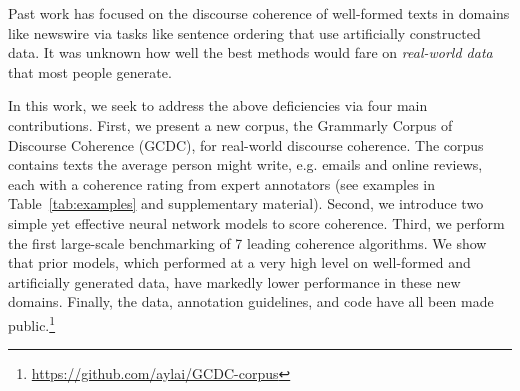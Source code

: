 \documentclass[11pt,a4paper]{article}
\newcommand \dataset{\textsc{GCDC}\xspace}
\begin{document}
Past work has focused on the discourse coherence of well-formed texts in domains like newswire \cite{barzilay-lapata:2005:ACL,elsner-charniak:2008:ACLShort} via tasks like sentence ordering that use artificially constructed data. It was unknown how well the best methods would fare on {\em real-world data} that most people generate.






In this work, we seek to address the above deficiencies via four main contributions.  First, we present a new corpus, the Grammarly Corpus of Discourse Coherence (\dataset), for real-world discourse coherence. The corpus contains texts the average person might write, e.g. emails and online reviews, each with a coherence rating from expert annotators (see examples in Table~\ref{tab:examples} and supplementary material). Second, we introduce two simple yet effective neural network models to score coherence.  Third, we perform the first large-scale benchmarking of 7 leading coherence algorithms.  We show that prior models, which performed at a very high level on well-formed and artificially generated data, have markedly lower performance in these new domains.  
Finally, the data, annotation guidelines, and code have all been made public.\footnote{\url{https://github.com/aylai/GCDC-corpus}}

 
\end{document}
